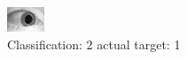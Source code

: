 \begin{figure}[h!]
\begin{center}
\includegraphics[width=0.60\columnwidth]{figures/ID1559_class_2_target_1.png}
\end{center}
\caption{ Classification: 2 actual target: 1}
\label{fig:ID1559_class_2_target_1}
\end{figure}
